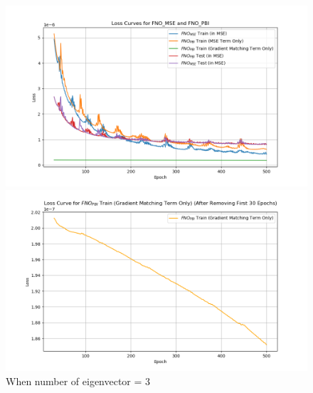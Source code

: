 \documentclass[
]{article}
\begin{document}
\begin{figure}

\begin{minipage}{\linewidth}

\includegraphics[width=1\textwidth,height=\textheight]{../../test/all_loss_3.png}

\end{minipage}%
\newline
\begin{minipage}{\linewidth}

\includegraphics[width=1\textwidth,height=\textheight]{../../test/PBI_term_3.png}

\end{minipage}%

\caption{\label{fig-eig1000}When number of eigenvector = 3}

\end{figure}%
\end{document}
